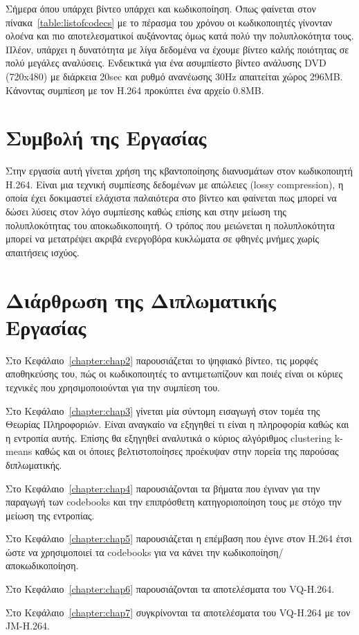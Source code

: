\indent
Σήμερα όπου υπάρχει βίντεο υπάρχει και κωδικοποίηση. Όπως φαίνεται στον πίνακα~\ref{table:listofcodecs} με το πέρασμα του χρόνου οι κωδικοποιητές γίνονταν ολοένα και πιο αποτελεσματικοί αυξάνοντας όμως κατά πολύ την πολυπλοκότητα τους. Πλέον, υπάρχει η δυνατότητα με λίγα δεδομένα να έχουμε βίντεο καλής ποιότητας σε πολύ μεγάλες αναλύσεις. Ενδεικτικά για ένα ασυμπίεστο βίντεο ανάλυσης DVD (720x480) με διάρκεια 20sec και ρυθμό ανανέωσης \si{30}{Hz} απαιτείται χώρος 296ΜΒ. Κάνοντας συμπίεση με τον H.264 προκύπτει ένα αρχείο 0.8ΜΒ.

\section{Συμβολή της Εργασίας}
\label{section:sect12}
\indent
Στην εργασία αυτή γίνεται χρήση της κβαντοποίησης διανυσμάτων στον κωδικοποιητή H.264. Είναι μια τεχνική συμπίεσης δεδομένων με απώλειες (lossy compression), η οποία έχει δοκιμαστεί ελάχιστα παλαιότερα στο βίντεο και φαίνεται πως μπορεί να δώσει λύσεις στον λόγο συμπίεσης καθώς επίσης και στην μείωση της πολυπλοκότητας του αποκωδικοποιητή. Ο τρόπος που μειώνεται η πολυπλοκότητα μπορεί να μετατρέψει ακριβά ενεργοβόρα κυκλώματα σε φθηνές μνήμες χωρίς απαιτήσεις ισχύος.

\section{Διάρθρωση της Διπλωματικής Εργασίας}
\label{section:sect13}


\indent
Στο Κεφάλαιο~\ref{chapter:chap2} παρουσιάζεται το ψηφιακό βίντεο, τις μορφές αποθηκεύσης του, πώς οι κωδικοποιητές το αντιμετωπίζουν και ποιές είναι οι κύριες τεχνικές που χρησιμοποιούνται για την συμπίεση του.\newline

 \indent
Στο Κεφάλαιο~\ref{chapter:chap3} γίνεται μία σύντομη εισαγωγή στον τομέα της Θεωρίας Πληροφοριών. Είναι αναγκαίο να εξηγηθεί τι είναι η πληροφορία καθώς και η εντροπία αυτής. Επίσης θα εξηγηθεί αναλυτικά ο κύριος αλγόριθμος clustering k-means καθώς και οι όποιες βελτιστοποίησες προέκυψαν στην πορεία της παρούσας διπλωματικής.\newline

 \indent
Στο Κεφάλαιο~\ref{chapter:chap4} παρουσιάζονται τα βήματα που έγιναν για την παραγωγή των codebooks και την επιπρόσθετη κατηγοριοποίηση τους με στόχο την μείωση της εντροπίας.\newline

 \indent
Στο Κεφάλαιο~\ref{chapter:chap5} παρουσιάζεται η επέμβαση που έγινε στον H.264 έτσι ώστε να χρησιμοποιεί τα codebooks για να κάνει την κωδικοποίηση/αποκωδικοποίηση.\newline 

 \indent
Στο Κεφάλαιο~\ref{chapter:chap6} παρουσιάζονται τα αποτελέσματα του VQ-H.264.\newline

 \indent
Στο Κεφάλαιο~\ref{chapter:chap7} συγκρίνονται τα αποτελέσματα του VQ-H.264 με τον JM-H.264.\newline